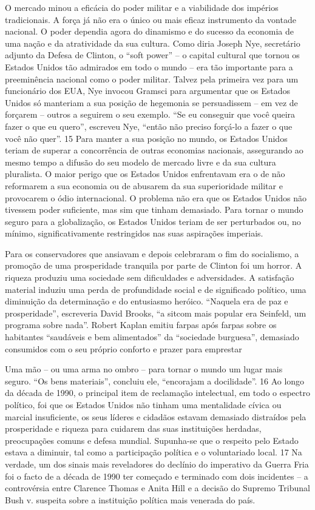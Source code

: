 O mercado minou a eficácia do poder militar e a viabilidade dos impérios tradicionais. A força já não era o único ou mais eficaz instrumento da vontade nacional. O poder dependia agora do dinamismo e do sucesso da economia de uma nação e da atratividade da sua cultura. Como diria Joseph Nye, secretário adjunto da Defesa de Clinton, o “soft power” – o capital cultural que tornou os Estados Unidos tão admirados em todo o mundo – era tão importante para a preeminência nacional como o poder militar. Talvez pela primeira vez para um funcionário dos EUA, Nye invocou Gramsci para argumentar que os Estados Unidos só manteriam a sua posição de hegemonia se persuadissem – em vez de forçarem – outros a seguirem o seu exemplo. “Se eu conseguir que você queira fazer o que eu quero”, escreveu Nye, “então não preciso forçá-lo a fazer o que você não quer”. {\color{blue}15} Para manter a sua posição no mundo, os Estados Unidos teriam de superar a concorrência de outras economias nacionais, assegurando ao mesmo tempo a difusão do seu modelo de mercado livre e da sua cultura pluralista. O maior perigo que os Estados Unidos enfrentavam era o de não reformarem a sua economia ou de abusarem da sua superioridade militar e provocarem o ódio internacional. O problema não era que os Estados Unidos não tivessem poder suficiente, mas sim que tinham demasiado. Para tornar o mundo seguro para a globalização, os Estados Unidos teriam de ser perturbados ou, no mínimo, significativamente restringidos nas suas aspirações imperiais.
 \par 
Para os conservadores que ansiavam e depois celebraram o fim do socialismo, a promoção de uma prosperidade tranquila por parte de Clinton foi um horror. A riqueza produziu uma sociedade sem dificuldades e adversidades. A satisfação material induziu uma perda de profundidade social e de significado político, uma diminuição da determinação e do entusiasmo heróico. “Naquela era de paz e prosperidade”, escreveria David Brooks, “a sitcom mais popular era Seinfeld, um programa sobre nada”. Robert Kaplan emitiu farpas após farpas sobre os habitantes “saudáveis ​​e bem alimentados” da “sociedade burguesa”, demasiado consumidos com o seu próprio conforto e prazer para emprestar
 \par 
Uma mão – ou uma arma no ombro – para tornar o mundo um lugar mais seguro. “Os bens materiais”, concluiu ele, “encorajam a docilidade”. {\color{blue}16} Ao longo da década de 1990, o principal item de reclamação intelectual, em todo o espectro político, foi que os Estados Unidos não tinham uma mentalidade cívica ou marcial insuficiente, os seus líderes e cidadãos estavam demasiado distraídos pela prosperidade e riqueza para cuidarem das suas instituições herdadas, preocupações comuns e defesa mundial. Supunha-se que o respeito pelo Estado estava a diminuir, tal como a participação política e o voluntariado local. {\color{blue}17} Na verdade, um dos sinais mais reveladores do declínio do imperativo da Guerra Fria foi o facto de a década de 1990 ter começado e terminado com dois incidentes – a controvérsia entre Clarence Thomas e Anita Hill e a decisão do Supremo Tribunal Bush v. suspeita sobre a instituição política mais venerada do país.
